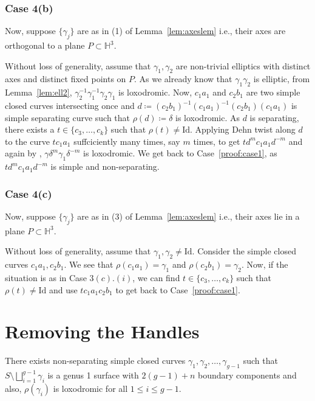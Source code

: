 \subsubsection{Case 4(b)} \label{proof:case4b} Now, suppose $\{\gamma_j\}$ are as in (1) of Lemma~\ref{lem:axeslem} i.e., their axes are orthogonal to a plane $P \subset \mathbb{H}^3$.

Without loss of generality, assume that $\gamma_1, \gamma_2$ are non-trivial elliptics with distinct axes and distinct fixed points on $P$. As we already know that $\gamma_1 \gamma_2$ is elliptic, from Lemma~\ref{lem:ell2}, $\gamma_2^{-1} \gamma_1^{-1} \gamma_2 \gamma_1$ is loxodromic. Now, $c_1 a_1$ and $c_2 b_1$ are two simple closed curves intersecting once and $d \coloneqq (c_2 b_1)^{-1} (c_1 a_1)^{-1} (c_2 b_1) (c_1 a_1)$ is simple separating curve such that $\rho(d) \coloneqq \delta$ is loxodromic. As $d$ is separating, there exists a $t \in \{c_3, \ldots, c_k\}$ such that $\rho(t) \neq \text{Id}$. Applying Dehn twist along $d$ to the curve $t c_1 a_1$ suffciciently many times, say $m$ times, to get $t d^m c_1 a_1 d^{-m}$ and again by \cite[Lemma 2.1.3]{GKM}, $\gamma \delta^m \gamma_1 \delta^{-m}$ is loxodromic. We get back to Case~\ref{proof:case1}, as $td^mc_1a_1d^{-m}$ is simple and non-separating.

\subsubsection{Case 4(c)} \label{proof:case4c} Now, suppose $\{\gamma_j\}$ are as in (3) of Lemma~\ref{lem:axeslem} i.e., their axes lie in a plane $P \subset \mathbb{H}^3$. 

Without loss of generality, assume that $\gamma_1, \gamma_2 \neq \text{Id}$. Consider the simple closed curves $c_1 a_1, c_2 b_1$. We see that $\rho(c_1 a_1) = \gamma_1$ and $\rho(c_2 b_1) = \gamma_2$. Now, if the situation is as in Case $3(c).(i)$, we can find $t \in \{c_3,\ldots,c_k\}$ such that $\rho(t) \neq \text{Id}$ and use $tc_1a_1c_2b_1$ to get back to Case~\ref{proof:case1}. 

\section{Removing the Handles}\label{sec:removinghandles}

\begin{prop}
	There exists non-separating simple closed curves $\gamma_1, \gamma_2,\ldots,\gamma_{g-1}$ such that $S \setminus \bigsqcup_{i=1}^{g-1} \gamma_i$ is a genus 1 surface with $2(g-1)+n$ boundary components and also, $\rho(\gamma_i)$ is loxodromic for all $1 \leq i \leq g-1$.
\end{prop}

